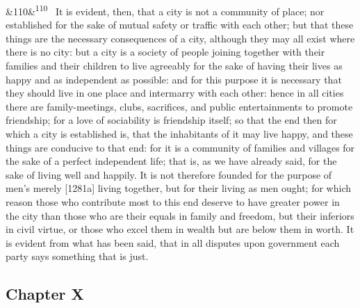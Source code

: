 \documentclass[12pt]{article}
\newcommand{\para}[1][]{\par\noindent\ifx&#1&\else\textsuperscript{\footnotesize #1}~\fi}
\begin{document}
\para[110] It is evident, then, that a city is not a community of place; nor established for the sake of mutual safety or traffic with each other; but that these things are the necessary consequences of a city, although they may all exist where there is no city: but a city is a society of people joining together with their families and their children to live agreeably for the sake of having their lives as happy and as independent as possible: and for this purpose it is necessary that they should live in one place and intermarry with each other: hence in all cities there are family-meetings, clubs, sacrifices, and public entertainments to promote friendship; for a love of sociability is friendship itself; so that the end then for which a city is established is, that the inhabitants of it may live happy, and these things are conducive to that end: for it is a community of families and villages for the sake of a perfect independent life; that is, as we have already said, for the sake of living well and happily. It is not therefore founded for the purpose of men's merely [1281a] living together, but for their living as men ought; for which reason those who contribute most to this end deserve to have greater power in the city than those who are their equals in family and freedom, but their inferiors in civil virtue, or those who excel them in wealth but are below them in worth. It is evident from what has been said, that in all disputes upon government each party says something that is just.

\subsection*{Chapter X}
\end{document}
